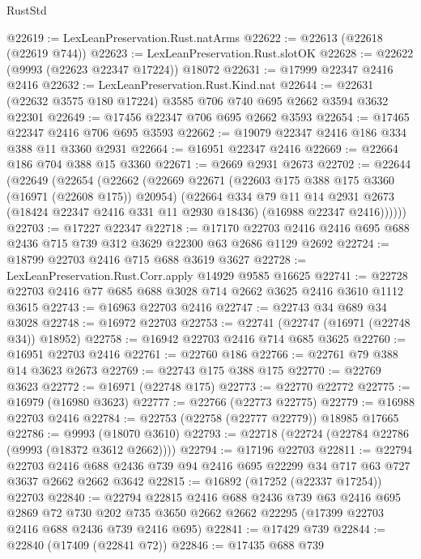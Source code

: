 \begin{lexlean}{RustStd}
\begin{coremodule}
@22619 := LexLeanPreservation.Rust.natArms
@22622 := @22613 (@22618 (@22619 @744))
@22623 := LexLeanPreservation.Rust.slotOK
@22628 := @22622 (@9993 (@22623 @22347 @17224)) @18072
@22631 := @17999 @22347 @2416 @2416
@22632 := LexLeanPreservation.Rust.Kind.nat
@22644 := @22631 (@22632 @3575 @180 @17224) @3585 @706 @740 @695 @2662 @3594 @3632 @22301
@22649 := @17456 @22347 @706 @695 @2662 @3593
@22654 := @17465 @22347 @2416 @706 @695 @3593
@22662 := @19079 @22347 @2416 @186 @334 @388 @11 @3360 @2931
@22664 := @16951 @22347 @2416
@22669 := @22664 @186 @704 @388 @15 @3360
@22671 := @2669 @2931 @2673
@22702 := @22644
    (@22649
      (@22654
        (@22662
          (@22669
            @22671
            (@22603 @175 @388 @175 @3360 (@16971 (@22608 @175)) @20954)
            (@22664
              @334
              @79
              @11
              @14
              @2931
              @2673
              (@18424 @22347 @2416 @331 @11 @2930 @18436)
              (@16988 @22347 @2416))))))
@22703 := @17227 @22347
@22718 := @17170
    @22703
    @2416
    @2416
    @695
    @688
    @2436
    @715
    @739
    @312
    @3629
    @22300
    @63
    @2686
    @1129
    @2692
@22724 := @18799 @22703 @2416 @715 @688 @3619 @3627
@22728 := LexLeanPreservation.Rust.Corr.apply @14929 @9585 @16625
@22741 := @22728 @22703 @2416 @77 @685 @688 @3028 @714 @2662 @3625 @2416 @3610 @1112 @3615
@22743 := @16963 @22703 @2416
@22747 := @22743 @34 @689 @34 @3028
@22748 := @16972 @22703
@22753 := @22741 (@22747 (@16971 (@22748 @34)) @18952)
@22758 := @16942 @22703 @2416 @714 @685 @3625
@22760 := @16951 @22703 @2416
@22761 := @22760 @186
@22766 := @22761 @79 @388 @14 @3623 @2673
@22769 := @22743 @175 @388 @175
@22770 := @22769 @3623
@22772 := @16971 (@22748 @175)
@22773 := @22770 @22772
@22775 := @16979 (@16980 @3623)
@22777 := @22766 (@22773 @22775)
@22779 := @16988 @22703 @2416
@22784 := @22753 (@22758 (@22777 @22779)) @18985 @17665
@22786 := @9993 (@18070 @3610)
@22793 := @22718 (@22724 (@22784 @22786 (@9993 (@18372 @3612 @2662))))
@22794 := @17196 @22703
@22811 := @22794
    @22703
    @2416
    @688
    @2436
    @739
    @94
    @2416
    @695
    @22299
    @34
    @717
    @63
    @727
    @3637
    @2662
    @2662
    @3642
@22815 := @16892 (@17252 (@22337 @17254)) @22703
@22840 := @22794
    @22815
    @2416
    @688
    @2436
    @739
    @63
    @2416
    @695
    @2869
    @72
    @730
    @202
    @735
    @3650
    @2662
    @2662
    @22295
    (@17399 @22703 @2416 @688 @2436 @739 @2416 @695)
@22841 := @17429 @739
@22844 := @22840 (@17409 (@22841 @72))
@22846 := @17435 @688 @739

\end{coremodule}
\end{lexlean}
